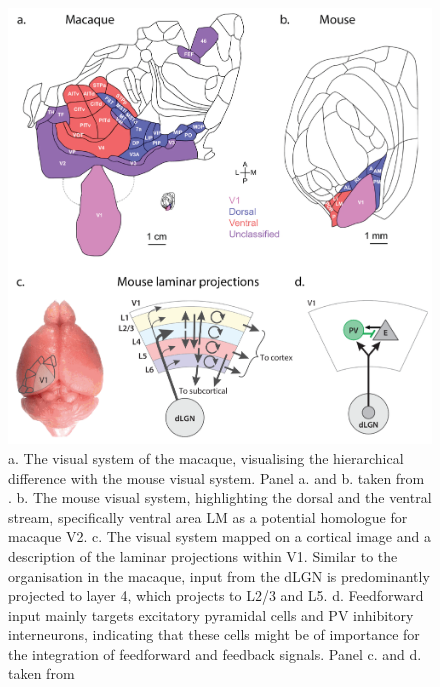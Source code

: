 \documentclass[12pt]{article}
\begin{document}
\begin{figure}[H]
  \centering
  \includegraphics[width=1.0 \textwidth]{adjusted_figures/Laminar_Figure.png}
  \caption{a. The visual system of the macaque, visualising the hierarchical difference with the mouse visual system. Panel a. and b. taken from \textcite{gamanutAnatomicalFunctionalConnectomes2022}. b. The mouse visual system, highlighting the dorsal and the ventral stream, specifically ventral area LM as a potential homologue for macaque V2. c. The visual system mapped on a cortical image and a description of the laminar projections within V1. Similar to the organisation in the macaque, input from the dLGN is predominantly projected to layer 4, which projects to L2/3 and L5. d. Feedforward input mainly targets excitatory pyramidal cells and PV inhibitory interneurons, indicating that these cells might be of importance for the integration of feedforward and feedback signals. Panel c. and d. taken from \textcite{niellHowCorticalCircuits2021}}
  \label{fig:Laminar_Figure}
\end{figure}
\end{document}
